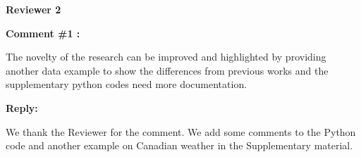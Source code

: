 \documentclass[11pt]{article}
\begin{document}
\bigskip


\itshape



{\large \textbf{Reviewer 2} }


\bigskip

\itshape


\textbf{Comment \#1 :}

The novelty of the research can be improved and highlighted by providing another data example to show the differences from previous works and the supplementary python codes need more documentation.

\medskip

\normalfont

\textbf{Reply:} 

We thank the Reviewer for the comment. We add some comments to the Python code and another example on Canadian weather in the Supplementary material.

\bigskip

\itshape

%
% 
\end{document}
